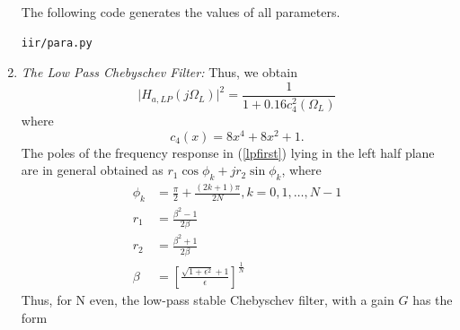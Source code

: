 \documentclass[journal,12pt,twocolumn]{IEEEtran}
\begin{document}
\begin{enumerate}
The following code generates the values of all parameters.
\begin{lstlisting}
iir/para.py
\end{lstlisting}
\item {\em{The Low Pass Chebyschev Filter:}} 
Thus, we obtain
\begin{equation}
\label{lpsqfinal}
\vert H_{a,LP}(j\Omega_L)\vert^2 = \frac{1}{1 + 0.16c_4^2(\Omega_L)}
\end{equation}
where
\begin{equation}
c_4(x) = 8x^4 + 8x^2 + 1.	
\end{equation}
The poles of the frequency response in (\ref{lpfirst}) lying in the left half plane are in general obtained as 
$r_1\cos\phi_k + jr_2\sin \phi_k$, where
\begin{align}
   \phi_k &= \frac{\pi}{2} + \frac{(2k+1)\pi}{2N}, k = 0, 1, \dots, N-1 \nonumber \\
r_1 &= \frac{\beta^2 - 1}{2\beta}\\
r_2 &= \frac{\beta^2 + 1}{2\beta}\\
\beta &= \left[ \frac{\sqrt{1 + \epsilon^2} + 1}{\epsilon}\right]^{\frac{1}{N}}
\end{align}
Thus, for N even, the low-pass stable Chebyschev filter, with a gain $G$ has the form
\begin{equation}
\begin{aligned}


\end{aligned}
\end{equation}
\end{enumerate}
\end{document}

